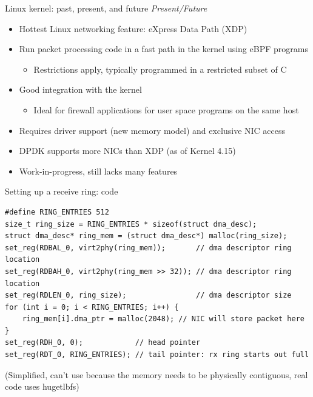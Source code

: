 \documentclass[NET,english,aspectratio=169]{tumbeamer}
\begin{document}
\begin{frame}{Linux kernel: past, present, and future}
\emph{Present/Future}
\begin{itemize}
\item Hottest Linux networking feature: eXpress Data Path (XDP)
\item Run packet processing code in a fast path in the kernel using eBPF programs
\begin{itemize}
\item Restrictions apply, typically programmed in a restricted subset of C
\end{itemize}
\item Good integration with the kernel
\begin{itemize}
\item Ideal for firewall applications for user space programs on the same host
\end{itemize}
\item<2-> Requires driver support (new memory model) and exclusive NIC access
\item<2-> DPDK supports more NICs than XDP (as of Kernel 4.15)
\item<2-> Work-in-progress, still lacks many features
\end{itemize}
\end{frame}

\begin{frame}[fragile=singleslide]{Setting up a receive ring: code}
\begin{verbatim}
#define RING_ENTRIES 512
size_t ring_size = RING_ENTRIES * sizeof(struct dma_desc);
struct dma_desc* ring_mem = (struct dma_desc*) malloc(ring_size);
set_reg(RDBAL_0, virt2phy(ring_mem));       // dma descriptor ring location
set_reg(RDBAH_0, virt2phy(ring_mem >> 32)); // dma descriptor ring location
set_reg(RDLEN_0, ring_size);                // dma descriptor size
for (int i = 0; i < RING_ENTRIES; i++) {
	ring_mem[i].dma_ptr = malloc(2048); // NIC will store packet here
}
set_reg(RDH_0, 0);            // head pointer
set_reg(RDT_0, RING_ENTRIES); // tail pointer: rx ring starts out full
\end{verbatim}
\footnotesize{(Simplified, can't use  because the memory needs to be physically contiguous, real code uses hugetlbfs)}
\end{frame}



%

%

\end{document}
